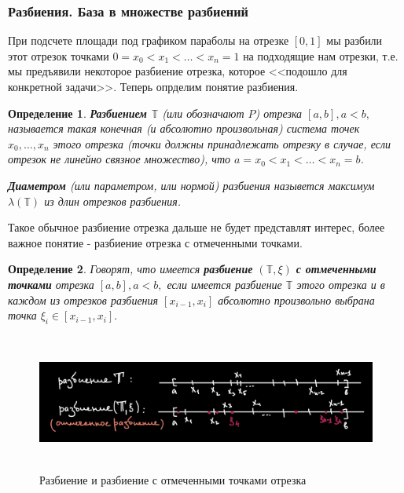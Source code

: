\documentclass[a4paper,14pt]{article} %
\newtheorem{definition}{Определение}
\begin{document}
	\subsubsection[Разбиения]{Разбиения. База в множестве разбиений}
	
	\setlength{\parindent}{0pt}
	
    При подсчете площади под графиком параболы на отрезке $[0, 1]$ 
	мы разбили этот отрезок точками \( 0=x_0 < x_1 < \dots < x_n = 1 \) на подходящие нам отрезки, т.е. мы предъявили некоторое разбиение отрезка, которое <<подошло для конкретной задачи>>. Теперь опрделим понятие разбиения.
	
	\begin{definition}
	\textbf{Разбиением \( \mathbb{T} \) }(или обозначают \(P\)) отрезка \( [a, b], a < b,\) называется такая конечная (и абсолютно произвольная) система точек \( x_0, \dots , x_n \) этого отрезка (точки должны принадлежать отрезку в случае, если отрезок не линейно связное множество\footnotemark{}), что \( a = x_0 < x_1 < \dots < x_n = b \).
	
	\textbf{Диаметром} (или параметром, или нормой) разбиения назывется максимум \( \lambda(\mathbb{T}) \) из длин отрезков разбиения.
	\end{definition}
	
	
	Такое обычное разбиение отрезка дальше не будет представлят интерес, более важное понятие - разбиение отрезка с отмеченными точками.
	
	\begin{definition}
	Говорят, что имеется \textbf{разбиение} \(( \mathbb{T}, \xi )\) \textbf{с отмеченными точками} отрезка \( [a, b], a < b,\) если имеется разбиение $ \mathbb{T} $ этого отрезка и в каждом из отрезков разбиения \( [x_{i-1}, x_i] \) абсолютно произвольно выбрана точка $ \xi_i \in [x_{i-1}, x_i]. $ 
	\end{definition}
	
	\begin{figure}[h]
	\centering
    \includegraphics[width=\textwidth, height=4.5cm]{Partition_of_an_interval.jpg}
    \caption{Разбиение и разбиение с отмеченными точками отрезка}
    \end{figure}
	
\end{document}
